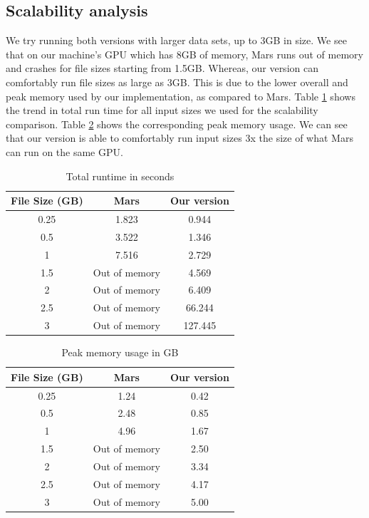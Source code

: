 \documentclass{article}
\begin{document}
\subsection{Scalability analysis}
We try running both versions with larger data sets, up to 3GB in size. We see that on our machine's GPU which has 8GB of memory, Mars runs out of memory and crashes for file sizes starting from 1.5GB. Whereas, our version can comfortably run file sizes as large as 3GB. This is due to the lower overall and peak memory used by our implementation, as compared to Mars. Table \ref{table:total-runtime} shows the trend in total run time for all input sizes we used for the scalability comparison. Table \ref{table:peak-memory-use} shows the corresponding peak memory usage. We can see that our version is able to comfortably run input sizes 3x the size of what Mars can run on the same GPU.   

\begin{table}[h!]
\centering
\begin{tabular}{|c|c|c|} 
 \hline
 File Size (GB) & Mars & Our version\\  
 \hline
 0.25 &  1.823 & 0.944  \\ 
 0.5 & 3.522 & 1.346  \\
 1 & 7.516 & 2.729  \\
 1.5 & Out of memory & 4.569 \\
 2 & Out of memory & 6.409 \\
 2.5 & Out of memory & 66.244 \\
 3 & Out of memory & 127.445 \\ 
\hline
\end{tabular}
\caption{Total runtime in seconds}
\label{table:total-runtime}
\end{table}


\begin{table}[h!]
\centering
\begin{tabular}{|c|c|c|} 
 \hline
 File Size (GB) & Mars & Our version\\  
 \hline
 0.25 &  1.24 & 0.42  \\ 
 0.5 & 2.48 & 0.85  \\
 1 & 4.96 & 1.67  \\
 1.5 & Out of memory & 2.50 \\
 2 & Out of memory & 3.34 \\
 2.5 & Out of memory & 4.17 \\
 3 & Out of memory & 5.00 \\ 
\hline
\end{tabular}
\caption{Peak memory usage in GB}
\label{table:peak-memory-use}
\end{table}
\end{document}

